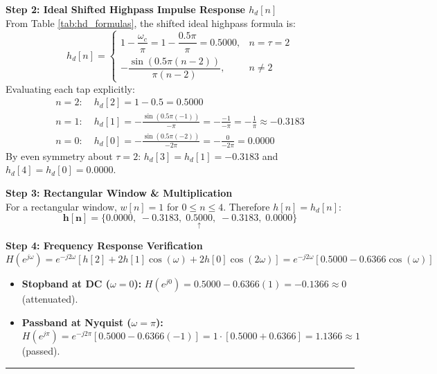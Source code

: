 \documentclass[11pt,a4paper]{article}
\begin{document}
\vspace{1mm}
\noindent\textbf{Step 2: Ideal Shifted Highpass Impulse Response $h_d[n]$} \\
From Table \ref{tab:hd_formulas}, the shifted ideal highpass formula is:
\begin{equation}
h_d[n] = \begin{cases} 1 - \dfrac{\omega_c}{\pi} = 1 - \dfrac{0.5\pi}{\pi} = 0.5000, & n = \tau = 2 \\[6pt] -\dfrac{\sin(0.5\pi(n-2))}{\pi(n-2)}, & n \ne 2 \end{cases}
\end{equation}
Evaluating each tap explicitly:
\begin{align}
n = 2: &\; h_d[2] = 1 - 0.5 = \mathbf{0.5000} \nonumber \\
n = 1: &\; h_d[1] = -\frac{\sin(0.5\pi(-1))}{-\pi} = -\frac{-1}{-\pi} = -\frac{1}{\pi} \approx \mathbf{-0.3183} \nonumber \\
n = 0: &\; h_d[0] = -\frac{\sin(0.5\pi(-2))}{-2\pi} = -\frac{0}{-2\pi} = \mathbf{0.0000}
\end{align}
By even symmetry about $\tau = 2$: $h_d[3] = h_d[1] = -0.3183$ and $h_d[4] = h_d[0] = 0.0000$.

\vspace{1mm}
\noindent\textbf{Step 3: Rectangular Window \& Multiplication} \\
For a rectangular window, $w[n] = 1$ for $0 \le n \le 4$. Therefore $h[n] = h_d[n]$:
\begin{equation}
\mathbf{h[n] = \{0.0000, \; -0.3183, \; \underset{\uparrow}{0.5000}, \; -0.3183, \; 0.0000\}}
\end{equation}

\noindent\textbf{Step 4: Frequency Response Verification}
\begin{equation}
H(e^{j\omega}) = e^{-j 2\omega} [h[2] + 2h[1]\cos(\omega) + 2h[0]\cos(2\omega)] = e^{-j 2\omega} [0.5000 - 0.6366\cos(\omega)]
\end{equation}
\begin{itemize}
    \item \textbf{Stopband at DC ($\omega = 0$):} $H(e^{j0}) = 0.5000 - 0.6366(1) = \mathbf{-0.1366} \approx 0$ (attenuated).
    \item \textbf{Passband at Nyquist ($\omega = \pi$):} $H(e^{j\pi}) = e^{-j 2\pi}[0.5000 - 0.6366(-1)] = 1 \cdot [0.5000 + 0.6366] = \mathbf{1.1366} \approx 1$ (passed).
\end{itemize}

\noindent\rule{\textwidth}{0.5pt}
\end{document}
